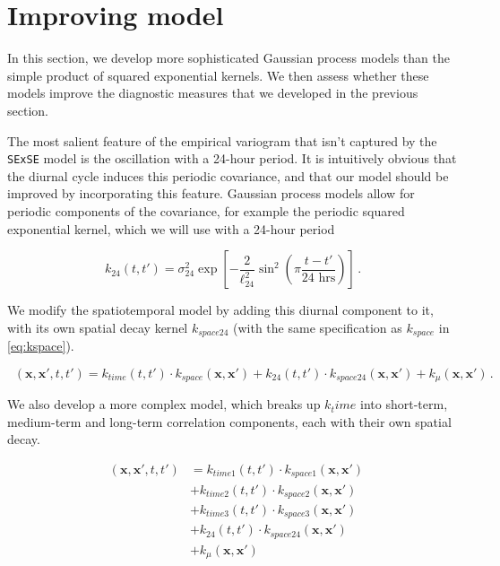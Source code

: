 \documentclass[letter]{article}
\newcommand{\genericdel}[3]{%
      \left#1#3\right#2
    }
\newcommand{\del}[1]{\genericdel(){#1}}
\newcommand{\sbr}[1]{\genericdel[]{#1}}
\newcommand{\xvec}{\mathbold{x}}
\DeclareMathOperator{\kdiurn}{k_{\mathtt{SESE_24}}}
\DeclareMathOperator{\ksumprod}{k_{\mathtt{sumprod}}}
\begin{document}
    	\section{Improving model}\label{improving-model}

In this section, we develop more sophisticated Gaussian process models
than the simple product of squared exponential kernels. We then assess
whether these models improve the diagnostic measures that we developed
in the previous section.

The most salient feature of the empirical variogram that isn't captured
by the \texttt{SExSE} model is the oscillation with a 24-hour period. It
is intuitively obvious that the diurnal cycle induces this periodic
covariance, and that our model should be improved by incorporating this
feature. Gaussian process models allow for periodic components of the
covariance, for example the periodic squared exponential kernel, which
we will use with a 24-hour period

\begin{equation}
    k_{24}(t,t') = \sigma_{24}^2 \exp\sbr{ - \frac{2}{\ell_{24}^2} \sin^2\del{
        \pi \frac{t-t'}{\text{24 hrs}} 
        }}\,.
\end{equation}

We modify the spatiotemporal model by adding this diurnal component to
it, with its own spatial decay kernel \(k_{space24}\) (with the same
specification as \(k_{space}\) in \eqref{eq:kspace}).

\begin{equation}
    \kdiurn(\xvec,\xvec',t,t') = k_{time}(t,t') \cdot k_{space}(\xvec, \xvec') 
        + k_{24}(t,t') \cdot k_{space24}(\xvec, \xvec')
        + k_\mu(\xvec, \xvec') 
        \,.
\end{equation}
    


    	We also develop a more complex model, which breaks up \(k_time\) into
short-term, medium-term and long-term correlation components, each with
their own spatial decay.

\begin{equation}
\begin{split}
    \ksumprod(\xvec,\xvec',t,t') &= 
           k_{time1}(t,t') \cdot k_{space1}(\xvec, \xvec') \\
        &+ k_{time2}(t,t') \cdot k_{space2}(\xvec, \xvec') \\
        &+ k_{time3}(t,t') \cdot k_{space3}(\xvec, \xvec')\\
        &+ k_{24}(t,t') \cdot k_{space24}(\xvec, \xvec') \\
        &+ k_\mu(\xvec, \xvec')
\end{split}
\end{equation}
\end{document}
